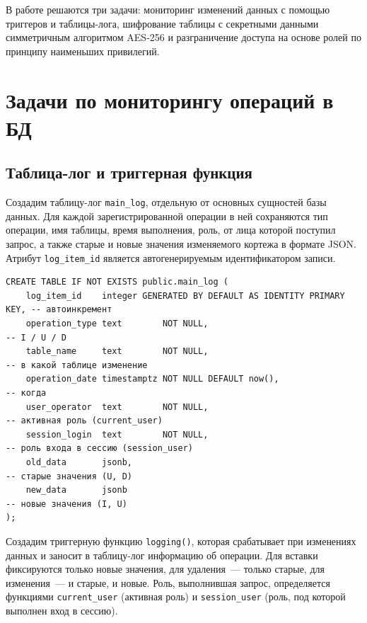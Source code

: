 \documentclass[a4paper,14pt]{article}
\begin{document}
В работе решаются три задачи: мониторинг изменений данных с помощью триггеров и таблицы-лога, шифрование таблицы с секретными данными симметричным алгоритмом AES-256 и разграничение доступа на основе ролей по принципу наименьших привилегий.

\newpage
\section{Задачи по мониторингу операций в БД}

\subsection{Таблица-лог и триггерная функция}
Создадим таблицу-лог \texttt{main\_log}, отдельную от основных сущностей базы данных. Для каждой зарегистрированной операции в ней сохраняются тип операции, имя таблицы, время выполнения, роль, от лица которой поступил запрос, а также старые и новые значения изменяемого кортежа в формате JSON. Атрибут \texttt{log\_item\_id} является автогенерируемым идентификатором записи.

\begin{lstlisting}
CREATE TABLE IF NOT EXISTS public.main_log (
    log_item_id    integer GENERATED BY DEFAULT AS IDENTITY PRIMARY KEY, -- автоинкремент
    operation_type text        NOT NULL,                                 -- I / U / D
    table_name     text        NOT NULL,                                 -- в какой таблице изменение
    operation_date timestamptz NOT NULL DEFAULT now(),                   -- когда
    user_operator  text        NOT NULL,                                 -- активная роль (current_user)
    session_login  text        NOT NULL,                                 -- роль входа в сессию (session_user)
    old_data       jsonb,                                                -- старые значения (U, D)
    new_data       jsonb                                                 -- новые значения (I, U)
);
\end{lstlisting}

Создадим триггерную функцию \texttt{logging()}, которая срабатывает при изменениях данных и заносит в таблицу-лог информацию об операции. Для вставки фиксируются только новые значения, для удаления~--- только старые, для изменения~--- и старые, и новые. Роль, выполнившая запрос, определяется функциями \texttt{current\_user} (активная роль) и \texttt{session\_user} (роль, под которой выполнен вход в сессию).
\end{document}
